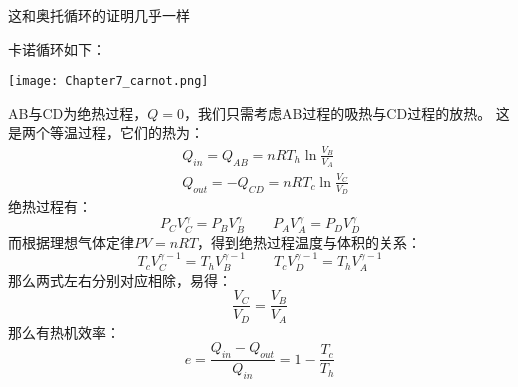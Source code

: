         \begin{prove}
            这和奥托循环的证明几乎一样

            卡诺循环如下：
            \begin{center}
                \texttt{[image: Chapter7\_carnot.png]}
            \end{center}
            AB与CD为绝热过程，$Q = 0$，我们只需考虑AB过程的吸热与CD过程的放热。
            这是两个等温过程，它们的热为：
            \begin{equation}
                \begin{aligned}
                    &Q_{in} = Q_{AB} = nRT_{h}\ln\frac{V_B}{V_A}\\
                    &Q_{out} = -Q_{CD} = nRT_{c}\ln\frac{V_C}{V_D}
                \end{aligned}
                \nonumber
            \end{equation}
            绝热过程有：
            \begin{equation}
                P_{C}V_{C}^{\gamma} = P_{B}V_{B}^{\gamma} \qquad   P_{A}V_{A}^{\gamma} = P_{D}V_{D}^{\gamma}
                \nonumber
            \end{equation}
            而根据理想气体定律$PV=nRT$，得到绝热过程温度与体积的关系：
            \begin{equation}
                T_{c}V_{C}^{\gamma-1} = T_{h}V_{B}^{\gamma-1} \qquad T_{c}V_{D}^{\gamma-1} = T_{h}V_{A}^{\gamma-1}
                \nonumber
            \end{equation}
            那么两式左右分别对应相除，易得：
            \begin{equation}
                \frac{V_C}{V_D} = \frac{V_B}{V_A}
                \nonumber
            \end{equation}
            那么有热机效率：
            \begin{equation}
                e = \frac{Q_{in}-Q_{out}}{Q_{in}} = 1 - \frac{T_{c}}{T_{h}}
            \end{equation}
        \end{prove}

